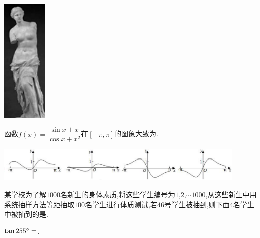 \documentclass[windows,list]{BHCexam}
\begin{document}
\begin{groups}
\begin{questions}[]
\begin{minipage}{\linewidth}

\begin{center}
	\includegraphics[height=6cm]{./sSFh6W64bKcV715x2rYUVGCnqVea4NCO.png}
	\vspace{0.5cm}
\end{center}
\begin{solution}{4cm}

\end{solution}
\end{minipage}
\vfill
\begin{minipage}{\linewidth}
\question[5] 函数$f(x)= \dfrac {\sin x+x}{\cos x+x^{2}}$在$[- \pi  ,  \pi ]$的图象大致为.
\begin{center}
\includegraphics[width=12cm]{./F7UJfg6iYCiCefLftREhksYit6NP46Of.png}
\vspace{0.5cm}
\end{center}
\begin{solution}{4cm}

\end{solution}
\end{minipage}
\vfill
\begin{minipage}{\linewidth}
\question[5] 某学校为了解$1000$名新生的身体素质,将这些学生编号为$1$,$2$,$ \cdots 1000$,从这些新生中用系统抽样方法等距抽取$100$名学生进行体质测试,若$46$号学生被抽到,则下面$4$名学生中被抽到的是.


\begin{solution}{4cm}

\end{solution}
\end{minipage}
\vfill
\begin{minipage}{\linewidth}
\question[5] $\tan255^{\small \circ}=$.
\begin{solution}{4cm}


\end{solution}
\end{minipage}
\end{questions}
\end{groups}
\end{document}
